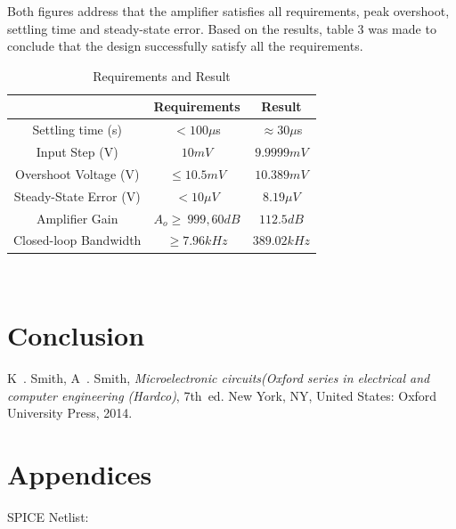 \documentclass[conference,compsoc]{IEEEtran}
\begin{document}
Both figures address that the amplifier satisfies all requirements, peak overshoot, settling time and steady-state error.  Based on the results, table 3 was made to conclude that the design successfully satisfy all the requirements.\\
\begin{table}[!hbt]
	\centering
	\begin{tabular}{|c|c|c|}
	\hline
	&Requirements&Result\\
	\hline	
	Settling time (s) & \(< 100 \mu \)s & \(\approx 30\mu \)s \\
	Input Step (V) & \(10 mV\)&\(9.9999mV\)\\
	Overshoot Voltage (V) & \(\leq 10.5 mV\)&\(10.389 mV\)\\
	Steady-State Error (V) & \(<10 \mu V\)&\(8.19\mu V\)\\
	Amplifier Gain & \(A_o \geq\ 999, 60 dB\)&\(112.5dB\)\\
	Closed-loop Bandwidth & \(\geq 7.96 kHz\)&\(389.02kHz\)\\
	\hline
	\end{tabular}
	\caption{Requirements and Result}\label{table: 3}
\end{table}\\
\section{Conclusion}

\begin{thebibliography}{1}

K~. Smith, A~. Smith, \emph{Microelectronic circuits(Oxford series in electrical and computer engineering (Hardco)}, 7th~ed. New York, NY, United States: Oxford University Press, 2014.

\end{thebibliography}

\onecolumn

\section{Appendices}
\noindent SPICE Netlist:\\
\begin{lstlisting}


\end{lstlisting}


%


\end{document}
